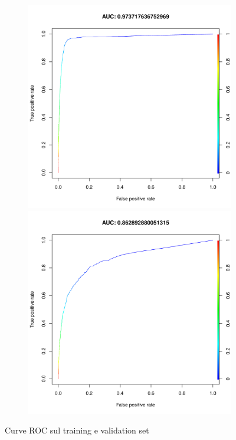 \begin{figure}[H]
	\centering
	\begin{subfigure}[t]{1\textwidth}
		\begin{minipage}[t]{0.475\textwidth}
			\includegraphics[width=\textwidth]{images/ml/random_forest/HoldoutRF/auc_train}
		\end{minipage}
		\hfill
		\begin{minipage}[t]{0.475\textwidth}
			\includegraphics[width=\textwidth]{images/ml/random_forest/HoldoutRF/auc_test}
		\end{minipage}
	\end{subfigure}
	\caption{Curve ROC sul training e validation set}
	\label{fig:rf_h_roc}
\end{figure}


